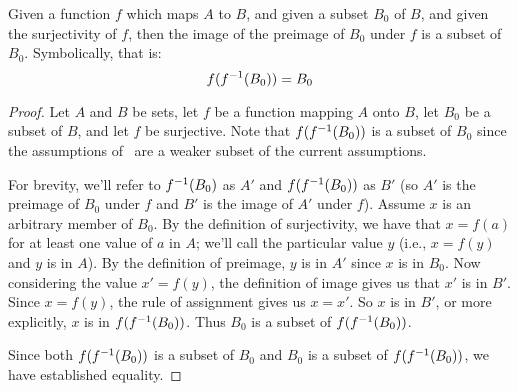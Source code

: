 \documentclass[main.tex]{subfiles}
\begin{document}
\begin{thm}
	Given a function \(f\) which maps \(A\) to \(B\), and given a subset
	\(B_0\) of \(B\), and given the surjectivity of \(f\), then the image of
	the preimage of \(B_0\) under \(f\) is a subset of \(B_0\).
	Symbolically, that is:
	\[f({f}^{-1}(B_0)) = B_0\]
\end{thm}
\begin{proof}
	Let \(A\) and \(B\) be sets, let \(f\) be a function mapping \(A\) onto
	\(B\), let \(B_0\) be a subset of \(B\), and let \(f\) be surjective.
	Note that \(f({f}^{-1}(B_0))\) is a subset of \(B_0\) since the
	assumptions of~ are a weaker subset of the current
	assumptions.

	For brevity, we'll refer to \({f}^{-1}(B_0)\) as \(A'\) and
	\(f({f}^{-1}(B_0))\) as \(B'\) (so \(A'\) is the preimage of \(B_0\)
	under \(f\) and \(B'\) is the image of \(A'\) under \(f\)). Assume \(x\)
	is an arbitrary member of \(B_0\). By the definition of surjectivity, we
	have that \(x = f(a)\) for at least one value of \(a\) in \(A\); we'll
	call the particular value \(y\) (i.e., \(x = f(y)\) and \(y\) is in
	\(A\)). By the definition of preimage, \(y\) is in \(A'\) since \(x\) is
	in \(B_0\). Now considering the value \(x' = f(y)\), the definition of
	image gives us that \(x'\) is in \(B'\). Since \(x = f(y)\), the rule of
	assignment gives us \(x = x'\). So \(x\) is in \(B'\), or more
	explicitly, \(x\) is in \(f({f}^{-1}(B_0))\). Thus \(B_0\) is a
	subset of \(f({f}^{-1}(B_0))\).

	Since both \(f({f}^{-1}(B_0))\) is a subset of \(B_0\) and \(B_0\) is
	a subset of \(f({f}^{-1}(B_0))\), we have established equality.
\end{proof}
\end{document}
